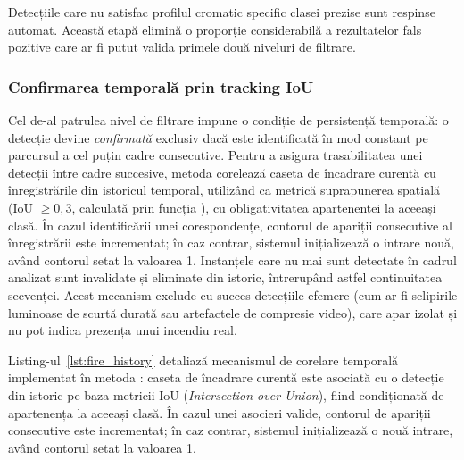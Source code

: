 \documentclass[../../main.tex]{subfiles}
\begin{document}
Detecțiile care nu satisfac profilul cromatic specific clasei prezise sunt respinse automat. Această etapă elimină o proporție considerabilă a rezultatelor fals pozitive care ar fi putut valida primele două niveluri de filtrare.

\subsubsection{Confirmarea temporală prin tracking IoU}
\label{subsubsec:confirmare_temporala}

Cel de-al patrulea nivel de filtrare impune o condiție de persistență temporală: o detecție devine \textit{confirmată} exclusiv dacă este identificată în mod constant pe parcursul a cel puțin  cadre consecutive. Pentru a asigura trasabilitatea unei detecții între cadre succesive, metoda  corelează caseta de încadrare curentă cu înregistrările din istoricul temporal, utilizând ca metrică suprapunerea spațială (IoU $\geq 0{,}3$, calculată prin funcția ), cu obligativitatea apartenenței la aceeași clasă. În cazul identificării unei corespondențe, contorul de apariții consecutive al înregistrării este incrementat; în caz contrar, sistemul inițializează o intrare nouă, având contorul setat la valoarea 1. Instanțele care nu mai sunt detectate în cadrul analizat sunt invalidate și eliminate din istoric, întrerupând astfel continuitatea secvenței. Acest mecanism exclude cu succes detecțiile efemere (cum ar fi sclipirile luminoase de scurtă durată sau artefactele de compresie video), care apar izolat și nu pot indica prezența unui incendiu real.

Listing-ul~\ref{lst:fire_history} detaliază mecanismul de corelare temporală implementat în metoda : caseta de încadrare curentă este asociată cu o detecție din istoric pe baza metricii IoU (\textit{Intersection over Union}), fiind condiționată de apartenența la aceeași clasă. În cazul unei asocieri valide, contorul de apariții consecutive este incrementat; în caz contrar, sistemul inițializează o nouă intrare, având contorul setat la valoarea 1.
\end{document}
